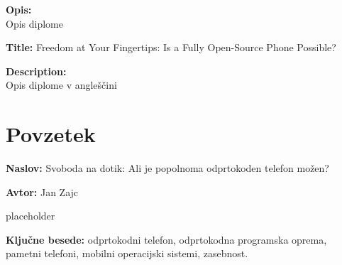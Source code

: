 \documentclass[a4paper,12pt,openright]{book}
\newcommand{\ttitle}{Svoboda na dotik: Ali je popolnoma odprtokoden telefon možen?}
\newcommand{\tauthor}{Jan Zajc}
\newcommand{\tkeywords}{odprtokodni telefon, odprtokodna programska oprema, pametni telefoni, mobilni operacijski sistemi, zasebnost}
\newcommand{\clearemptydoublepage}{\newpage{\pagestyle{empty}\cleardoublepage}}
\begin{document}
\bigskip
\noindent\textbf{Opis:}\\
Opis diplome

\bigskip
\noindent\textbf{Title:} Freedom at Your Fingertips: Is a Fully Open-Source Phone Possible?

\bigskip
\noindent\textbf{Description:}\\
Opis diplome v angleščini

\vfill



\vspace{2cm}

\clearemptydoublepage


\clearemptydoublepage




\pagestyle{empty}
\def\thepage{}%
\tableofcontents{}




\clearemptydoublepage

\chapter*{Povzetek}

\noindent\textbf{Naslov:} \ttitle
\bigskip

\noindent\textbf{Avtor:} \tauthor
\bigskip

\noindent placeholder

\bigskip

\noindent\textbf{Ključne besede:} \tkeywords.
\clearemptydoublepage
\end{document}
